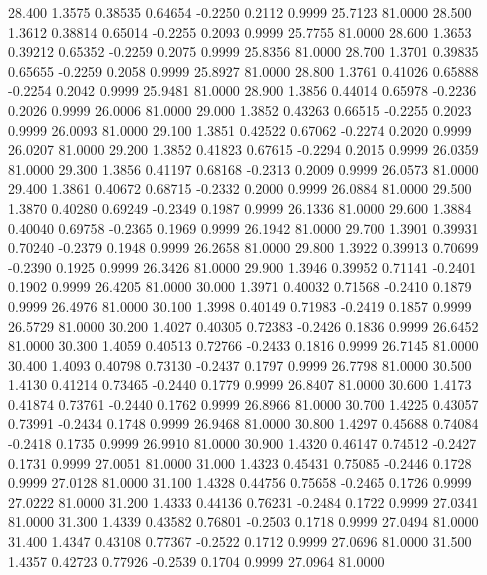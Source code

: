   28.400   1.3575   0.38535   0.64654  -0.2250   0.2112   0.9999  25.7123  81.0000
  28.500   1.3612   0.38814   0.65014  -0.2255   0.2093   0.9999  25.7755  81.0000
  28.600   1.3653   0.39212   0.65352  -0.2259   0.2075   0.9999  25.8356  81.0000
  28.700   1.3701   0.39835   0.65655  -0.2259   0.2058   0.9999  25.8927  81.0000
  28.800   1.3761   0.41026   0.65888  -0.2254   0.2042   0.9999  25.9481  81.0000
  28.900   1.3856   0.44014   0.65978  -0.2236   0.2026   0.9999  26.0006  81.0000
  29.000   1.3852   0.43263   0.66515  -0.2255   0.2023   0.9999  26.0093  81.0000
  29.100   1.3851   0.42522   0.67062  -0.2274   0.2020   0.9999  26.0207  81.0000
  29.200   1.3852   0.41823   0.67615  -0.2294   0.2015   0.9999  26.0359  81.0000
  29.300   1.3856   0.41197   0.68168  -0.2313   0.2009   0.9999  26.0573  81.0000
  29.400   1.3861   0.40672   0.68715  -0.2332   0.2000   0.9999  26.0884  81.0000
  29.500   1.3870   0.40280   0.69249  -0.2349   0.1987   0.9999  26.1336  81.0000
  29.600   1.3884   0.40040   0.69758  -0.2365   0.1969   0.9999  26.1942  81.0000
  29.700   1.3901   0.39931   0.70240  -0.2379   0.1948   0.9999  26.2658  81.0000
  29.800   1.3922   0.39913   0.70699  -0.2390   0.1925   0.9999  26.3426  81.0000
  29.900   1.3946   0.39952   0.71141  -0.2401   0.1902   0.9999  26.4205  81.0000
  30.000   1.3971   0.40032   0.71568  -0.2410   0.1879   0.9999  26.4976  81.0000
  30.100   1.3998   0.40149   0.71983  -0.2419   0.1857   0.9999  26.5729  81.0000
  30.200   1.4027   0.40305   0.72383  -0.2426   0.1836   0.9999  26.6452  81.0000
  30.300   1.4059   0.40513   0.72766  -0.2433   0.1816   0.9999  26.7145  81.0000
  30.400   1.4093   0.40798   0.73130  -0.2437   0.1797   0.9999  26.7798  81.0000
  30.500   1.4130   0.41214   0.73465  -0.2440   0.1779   0.9999  26.8407  81.0000
  30.600   1.4173   0.41874   0.73761  -0.2440   0.1762   0.9999  26.8966  81.0000
  30.700   1.4225   0.43057   0.73991  -0.2434   0.1748   0.9999  26.9468  81.0000
  30.800   1.4297   0.45688   0.74084  -0.2418   0.1735   0.9999  26.9910  81.0000
  30.900   1.4320   0.46147   0.74512  -0.2427   0.1731   0.9999  27.0051  81.0000
  31.000   1.4323   0.45431   0.75085  -0.2446   0.1728   0.9999  27.0128  81.0000
  31.100   1.4328   0.44756   0.75658  -0.2465   0.1726   0.9999  27.0222  81.0000
  31.200   1.4333   0.44136   0.76231  -0.2484   0.1722   0.9999  27.0341  81.0000
  31.300   1.4339   0.43582   0.76801  -0.2503   0.1718   0.9999  27.0494  81.0000
  31.400   1.4347   0.43108   0.77367  -0.2522   0.1712   0.9999  27.0696  81.0000
  31.500   1.4357   0.42723   0.77926  -0.2539   0.1704   0.9999  27.0964  81.0000
